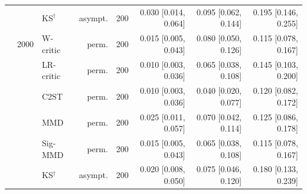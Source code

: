 \begin{tabular}{lllrrrrr}
 &  & KS$^{\dagger}$ & asympt. & 200 & 0.030 [0.014, 0.064] & 0.095 [0.062, 0.144] & 0.195 [0.146, 0.255] \\
 & 2000 & W-critic & perm. & 200 & 0.015 [0.005, 0.043] & 0.080 [0.050, 0.126] & 0.115 [0.078, 0.167] \\
 &  & LR-critic & perm. & 200 & 0.010 [0.003, 0.036] & 0.065 [0.038, 0.108] & 0.145 [0.103, 0.200] \\
 &  & C2ST & perm. & 200 & 0.010 [0.003, 0.036] & 0.040 [0.020, 0.077] & 0.120 [0.082, 0.172] \\
 &  & MMD & perm. & 200 & 0.025 [0.011, 0.057] & 0.070 [0.042, 0.114] & 0.125 [0.086, 0.178] \\
 &  & Sig-MMD & perm. & 200 & 0.015 [0.005, 0.043] & 0.065 [0.038, 0.108] & 0.115 [0.078, 0.167] \\
 &  & KS$^{\dagger}$ & asympt. & 200 & 0.020 [0.008, 0.050] & 0.075 [0.046, 0.120] & 0.180 [0.133, 0.239] \\
\bottomrule
\end{tabular}
